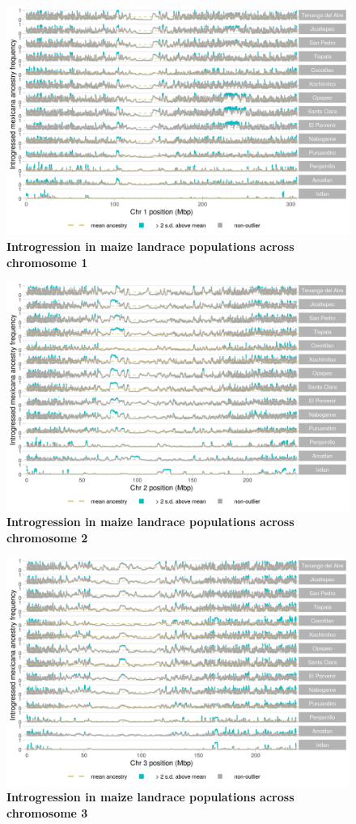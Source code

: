 \begin{figure}[ht]
\includegraphics[width=.85\textwidth]{chapter2/figures/maize_shared_outliers_chr_1.png}
\caption{\color{Gray} \textbf{Introgression in maize landrace populations across chromosome 1}}
\label{maize_chr1}
\end{figure}

\begin{figure}[ht]
\includegraphics[width=.85\textwidth]{chapter2/figures/maize_shared_outliers_chr_2.png}
\caption{\color{Gray} \textbf{Introgression in maize landrace populations across chromosome 2}}
\label{maize_chr2}
\end{figure}

\begin{figure}[ht]
\includegraphics[width=.85\textwidth]{chapter2/figures/maize_shared_outliers_chr_3.png}
\caption{\color{Gray} \textbf{Introgression in maize landrace populations across chromosome 3}}
\label{maize_chr3}
\end{figure}

